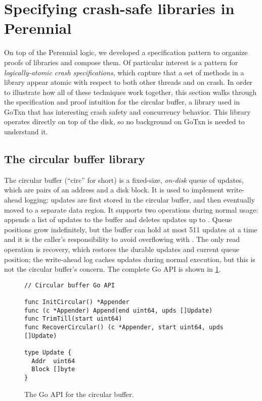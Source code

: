 \section{Specifying crash-safe libraries in Perennial}
\label{sec:perennial:crash-hocap}

On top of the Perennial logic, we developed a specification pattern to organize proofs
of libraries and compose them. Of particular interest is a pattern for
\emph{logically-atomic crash specifications}, which capture that a set of
methods in a library appear atomic with respect to both other threads and on
crash. In order to illustrate how all of these techniques work together, this
section walks through the specification and proof intuition for the circular
buffer, a library used in GoTxn that has interesting crash safety and
concurrency behavior. This library operates directly on top of the disk, so no
background on GoTxn is needed to understand it.

\subsection{The circular buffer library}

The circular buffer (``circ'' for short) is a fixed-size, \emph{on-disk} queue of
updates, which are pairs of an address and a disk block. It is used to implement
write-ahead logging: updates are first stored in the circular buffer, and
then eventually moved to a separate data region. It supports two operations
during normal usage:  appends a list of updates to the buffer
and  deletes updates up to . Queue positions grow
indefinitely, but the buffer can hold at most 511 updates at a time and it
is the caller's responsibility to avoid overflowing with . The only
read operation is recovery, which restores the durable updates and current queue
position; the write-ahead log caches updates during normal execution, but this
is not the circular buffer's concern. The complete Go API is shown in
\cref{fig:circ:api}.

\begin{figure}[ht]
\begin{verbatim}
// Circular buffer Go API

func InitCircular() *Appender
func (c *Appender) Append(end uint64, upds []Update)
func TrimTill(start uint64)
func RecoverCircular() (c *Appender, start uint64, upds []Update)

type Update {
  Addr  uint64
  Block []byte
}
\end{verbatim}
  \caption{The Go API for the circular buffer.}%
  \label{fig:circ:api}
\end{figure}

